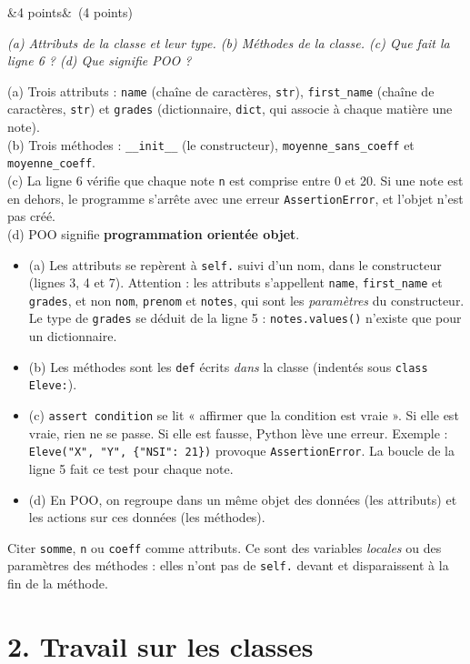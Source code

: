 \documentclass[11pt, a4paper]{exam}
\newcommand{\code}[1]{\texttt{#1}}
\newcommand{\Q}[3]{\par\needspace{5\baselineskip}\bigskip\noindent{\large\bfseries Question #1}\ifx&#2&\else\ \textnormal{(#2)}\fi\par\nopagebreak\smallskip\noindent\textit{#3}\par\nopagebreak\smallskip}
\begin{document}
\Q{1}{4 points}{(a) Attributs de la classe et leur type. (b) Méthodes de la classe. (c) Que fait la ligne 6 ? (d) Que signifie POO ?}
\begin{reponse}
(a) Trois attributs : \code{name} (chaîne de caractères, \code{str}), \code{first\_name} (chaîne de caractères, \code{str}) et \code{grades} (dictionnaire, \code{dict}, qui associe à chaque matière une note). \\
(b) Trois méthodes : \code{\_\_init\_\_} (le constructeur), \code{moyenne\_sans\_coeff} et \code{moyenne\_coeff}. \\
(c) La ligne 6 vérifie que chaque note \code{n} est comprise entre 0 et 20. Si une note est en dehors, le programme s'arrête avec une erreur \code{AssertionError}, et l'objet n'est pas créé. \\
(d) POO signifie \textbf{programmation orientée objet}.
\end{reponse}
\begin{itemize}
\item (a) Les attributs se repèrent à \code{self.} suivi d'un nom, dans le constructeur (lignes 3, 4 et 7). Attention : les attributs s'appellent \code{name}, \code{first\_name} et \code{grades}, et non \code{nom}, \code{prenom} et \code{notes}, qui sont les \emph{paramètres} du constructeur. Le type de \code{grades} se déduit de la ligne 5 : \code{notes.values()} n'existe que pour un dictionnaire.
\item (b) Les méthodes sont les \code{def} écrits \emph{dans} la classe (indentés sous \code{class Eleve:}).
\item (c) \code{assert condition} se lit « affirmer que la condition est vraie ». Si elle est vraie, rien ne se passe. Si elle est fausse, Python lève une erreur. Exemple : \code{Eleve("X", "Y", \{"NSI": 21\})} provoque \code{AssertionError}. La boucle de la ligne 5 fait ce test pour chaque note.
\item (d) En POO, on regroupe dans un même objet des données (les attributs) et les actions sur ces données (les méthodes).
\end{itemize}
\begin{erreur}
Citer \code{somme}, \code{n} ou \code{coeff} comme attributs. Ce sont des variables \emph{locales} ou des paramètres des méthodes : elles n'ont pas de \code{self.} devant et disparaissent à la fin de la méthode.
\end{erreur}

\section*{2. Travail sur les classes}
\end{document}
